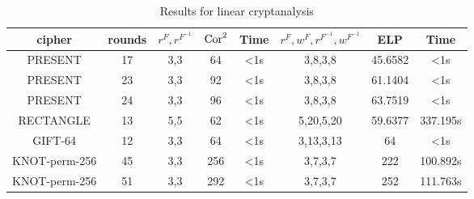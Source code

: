 \begin{table}
	\caption{Results for linear cryptanalysis}\label{tab:ELP}
	\centering
	\begin{tabular}{|c|c|c|c|c|c|c|c|}
		\hline
		cipher & rounds & $r^F,r^{F^{-1}}$ & $\text{Cor}^2$ & Time & $r^F,w^F,r^{F^{-1}},w^{F^{-1}}$ & ELP & Time \\
		\hline
		PRESENT & 17 & 3,3 & 64 & <1s & 3,8,3,8 & 45.6582 & <1s\\
		\hline 
		PRESENT & 23 & 3,3 & 92 & <1s & 3,8,3,8 & 61.1404 & <1s\\
		\hline 
		PRESENT & 24 & 3,3 & 96 & <1s & 3,8,3,8 & 63.7519 & <1s\\
		\hline 
		RECTANGLE & 13 & 5,5 & 62 & <1s & 5,20,5,20 & 59.6377 & 337.195s \\
		\hline
		GIFT-64 & 12 & 3,3 & 64 & <1s& 3,13,3,13 & 64 & <1s \\
		\hline
		KNOT-perm-256 & 45 & 3,3 & 256 & <1s & 3,7,3,7 & 222 & 100.892s\\
		\hline
		KNOT-perm-256 & 51 & 3,3 & 292 & <1s & 3,7,3,7 & 252 & 111.763s\\
		\hline
	\end{tabular}
\end{table}



